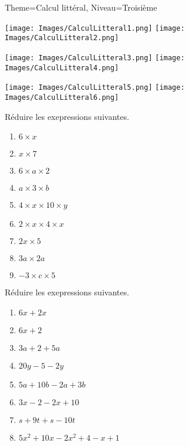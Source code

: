 \documentclass[11pt]{article}
\begin{document}
\begin{multicols}{2}

\begin{Maquette}[Fiche]{Theme=Calcul littéral, Niveau=Troisième}

\begin{exercice}
    \texttt{[image: Images/CalculLitteral1.png]}
    \texttt{[image: Images/CalculLitteral2.png]}
\end{exercice}

\begin{exercice}
\texttt{[image: Images/CalculLitteral3.png]}
\texttt{[image: Images/CalculLitteral4.png]}
\end{exercice}

\begin{exercice}
\texttt{[image: Images/CalculLitteral5.png]}
\texttt{[image: Images/CalculLitteral6.png]}
\end{exercice}

\begin{exercice}
    Réduire les exepressions suivantes.
    \begin{multicols}{2}
        \begin{enumerate}[label=\textbf{\alph*.}]
        \item $6\times x$
        \item $x \times 7$
        \item $6\times a \times 2$
        \item $a \times 3 \times b$
        \item $4\times x \times 10\times y$
        \item $2\times x \times 4 \times x$
        \item $2x\times 5$
        \item $3a \times 2a$
        \item $-3 \times c \times 5$
    \end{enumerate}
    \end{multicols}
\end{exercice}


\begin{exercice}
    Réduire les exepressions suivantes.
    \begin{enumerate}[label=\textbf{\alph*.}]
        \item $6x + 2x$
        \item $6x + 2$
        \item $3a + 2 + 5a$
        \item $20y - 5 -2y$
        \item $5a + 10b - 2a + 3b$
        \item $3x -2 -2x + 10$
        \item $s + 9t + s - 10t$
        \item $5x^2 + 10x - 2x^2 + 4 - x + 1$
    \end{enumerate}
\end{exercice}


\end{Maquette}
\end{multicols}
\end{document}
